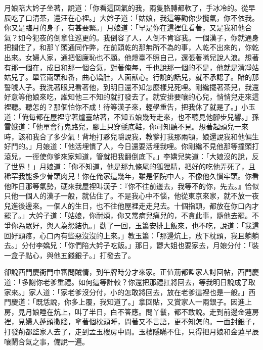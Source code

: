 月娘陪大妗子坐著，說道：「你看這回氣的我，兩隻胳膊都軟了，手冰冷的。從早辰吃了口清茶，還汪在心裡。」大妗子道：「姑娘，我這等勸你少攬氣，你不依我。你又是臨月的身子，有甚要緊。」月娘道：「早是你在這裡住看著，又是我和他合氣？如今犯夜的倒拿住巡更的。我倒容了人，人倒不肯容我。一個漢子，你就通身把攔住了，和那丫頭通同作弊，在前頭乾的那無所不為的事，人乾不出來的，你乾出來。女婦人家，通把個廉恥也不顧。他燈臺不照自己，還張著嘴兒說人浪。想著有那一個在，成日和那一個合氣，對著俺每，千也說那一個的不是，他就是清凈姑姑兒了。單管兩頭和番，曲心矯肚，人面獸心。行說的話兒，就不承認了。賭的那誓唬人子。我洗著眼兒看著他，到明日還不知怎麼樣兒死哩。剛纔擺著茶兒，我還好意等他娘來吃，誰知他三不知的就打發去了。就安排要嚷的心兒，悄悄兒走來這裡聽。聽怎的？那個怕你不成！待等漢子來，輕學重告，把我休了就是了。」小玉道：「俺每都在屋裡守著爐臺站著，不知五娘幾時走來，也不聽見他腳步兒響。」孫雪娥道：「他單會行鬼路兒，腳上只穿氈底鞋，你可知聽不見。想著起頭兒一來時，該和我合了多少氣！背地打夥兒嚼說我，教爹打我那兩頓，娘還說我和他偏生好鬥的。」月娘道：「他活埋慣了人，今日還要活埋我哩。你剛纔不見他那等撞頭打滾兒，一徑使你爹來家知道，管就把我翻倒底下。」李嬌兒笑道：「大娘沒的說，反了世界！」月娘道：「你不知道，他是那九條尾的狐狸精，把好的吃他弄死了，且稀罕我能多少骨頭肉兒！你在俺家這幾年，雖是個院中人，不像他久慣牢頭。你看他昨日那等氣勢，硬來我屋裡叫漢子：『你不往前邊去，我等不的你，先去。』恰似只他一個人的漢子一般，就佔住了。不是我心中不惱，他從東京來家，就不放一夜兒進後邊來。一個人的生日，也不往他屋裡走走兒去。十個指頭，都放在你口內才罷了。」大妗子道：「姑娘，你耐煩，你又常病兒痛兒的，不貪此事，隨他去罷。不爭你為眾好，與人為怨結仇。」勸了一回，玉簫安排上飯來，也不吃，說道：「我這回好頭疼，心口內有些惡沒沒的上來。」教玉簫：「那邊炕上，放下枕頭，我且躺躺去。」分付李嬌兒：「你們陪大妗子吃飯。」那日，鬱大姐也要家去，月娘分付：「裝一盒子點心，與他五錢銀子。」打發去了。

卻說西門慶衙門中審問賊情，到午牌時分才來家。正值荊都監家人討回帖，西門慶道：「多謝你老爹重禮。如何這等計較？你還把那禮扛將回去，等我明日說成了取家來。」家人道：「家老爹沒分付，小的怎敢將回去，放在老爹這裡也是一般。」西門慶道：「既恁說，你多上覆，我知道了。」拿回貼，又賞家人一兩銀子。因進上房，見月娘睡在炕上，叫了半日，白不答應。問丫鬟，都不敢說。走到前邊金蓮房裡，見婦人蓬頭撒腦，拿著個枕頭睡，問著又不言語，更不知怎的。一面封銀子，打發荊都監家人去了，走到孟玉樓房中問。玉樓隱瞞不住，只得把月娘和金蓮早辰嚷鬧合氣之事，備說一遍。


